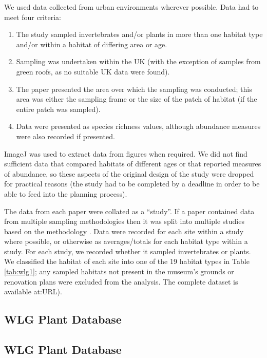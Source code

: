 We used data collected from urban environments wherever possible. Data had to meet four criteria:
\begin{enumerate}
\item The study sampled invertebrates and/or plants in more than one habitat type and/or within a habitat of differing area or age.
\item Sampling was undertaken within the UK (with the exception of samples from green roofs, as no suitable UK data were found).
\item The paper presented the area over which the sampling was conducted; this area was either the sampling frame or the size of the patch of habitat (if the entire patch was sampled). 
\item Data were presented as species richness values, although abundance measures were also recorded if presented.
\end{enumerate}
ImageJ \citep{schindelin:2012fiji} was used to extract data from figures when required. We did not find sufficient data that compared habitats of different ages or that reported measures of abundance, so these aspects of the original design of the study were dropped for practical reasons (the study had to be completed by a deadline in order to be able to feed into the planning process).

The data from each paper were collated as a ``study''. If a paper contained data from multiple sampling methodologies then it was split into multiple studies based on the methodology \citep[following][]{Hudson:2014predicts}. Data were recorded for each site within a study where possible, or otherwise as averages/totals for each habitat type within a study. For each study, we recorded whether it sampled invertebrates or plants. We classified the habitat of each site into one of the 19 habitat types in Table \ref{tab:wlg1}; any sampled habitats not present in the museum's grounds or renovation plans were excluded from the analysis. The complete dataset is available at:URL).

\ifappendixStyle %
\subsection{WLG Plant Database}%
\else
\subsection*{WLG Plant Database}
\fi

